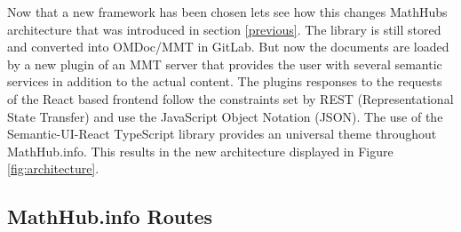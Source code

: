 \documentclass[11pt,a4paper]{article}
\begin{document}
Now that a new framework has been chosen lets see how this changes MathHubs architecture that was introduced in section \ref{previous}.
The library is still stored and converted into OMDoc/MMT in GitLab.
But now the documents are loaded by a new plugin of an MMT server that provides the user with several semantic services in addition to the actual content.
The plugins responses to the requests of the React based frontend follow the constraints set by REST (Representational State Transfer) and use the JavaScript Object Notation (JSON).
The use of the Semantic-UI-React TypeScript library provides an universal theme throughout MathHub.info.
This results in the new architecture displayed in Figure \ref{fig:architecture}.

\subsection{MathHub.info Routes} \label{routes}
\end{document}
